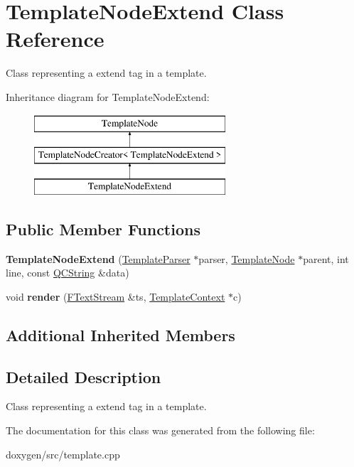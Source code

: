 \hypertarget{class_template_node_extend}{}\section{Template\+Node\+Extend Class Reference}
\label{class_template_node_extend}


Class representing a \textquotesingle{}extend\textquotesingle{} tag in a template.  


Inheritance diagram for Template\+Node\+Extend\+:\begin{figure}[H]
\begin{center}
\leavevmode
\includegraphics[height=3.000000cm]{class_template_node_extend}
\end{center}
\end{figure}
\subsection*{Public Member Functions}
\begin{DoxyCompactItemize}
\item 
\mbox{\label{class_template_node_extend_aa36132b7fe39fb62f1cc9e79770ba5d8}} 
{\bfseries Template\+Node\+Extend} (\mbox{\hyperlink{class_template_parser}{Template\+Parser}} $\ast$parser, \mbox{\hyperlink{class_template_node}{Template\+Node}} $\ast$parent, int line, const \mbox{\hyperlink{class_q_c_string}{Q\+C\+String}} \&data)
\item 
\mbox{\label{class_template_node_extend_a61266a024cdfe201cfd83847676b5441}} 
void {\bfseries render} (\mbox{\hyperlink{class_f_text_stream}{F\+Text\+Stream}} \&ts, \mbox{\hyperlink{class_template_context}{Template\+Context}} $\ast$c)
\end{DoxyCompactItemize}
\subsection*{Additional Inherited Members}


\subsection{Detailed Description}
Class representing a \textquotesingle{}extend\textquotesingle{} tag in a template. 

The documentation for this class was generated from the following file\+:\begin{DoxyCompactItemize}
\item 
doxygen/src/template.\+cpp\end{DoxyCompactItemize}
